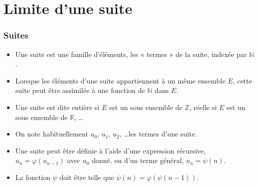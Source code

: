 \documentclass[10pt,notheorems]{beamer}
\theoremstyle{plain}
\theoremstyle{definition} %
\begin{document}
\section{Limite d'une suite}

\begin{frame}
  \frametitle{Suites}

  \begin{itemize}

  \item Une suite est une famille d'éléments, les « termes » de la suite, indexée par $\mathbb N$.\newline

  \item Lorsque les éléments d'une suite appartiennent à un même ensemble $E$, cette suite peut être assimilée à une fonction de $\mathbb N$ dans $E$.\newline

  \item Une suite est dite entière si $E$ est un sous ensemble de $\mathbb Z$, réelle si $E$ est un sous ensemble de $\mathbb R$, \dots\newline

  \item On note habituellement $u_0$, $u_1$, $u_2$, \ldots les termes d'une suite.\newline

  \item Une suite peut être définie à l'aide d'une expression récursive, $u_n = \varphi(u_{n-1})$ avec $u_0$ donné, ou  d'un terme général, $u_n = \psi(n)$.\newline

  \item La fonction $\psi$ doit être telle que $\psi(n) = \varphi(\psi(n-1))$.

  \end{itemize}

\end{frame}
\end{document}

